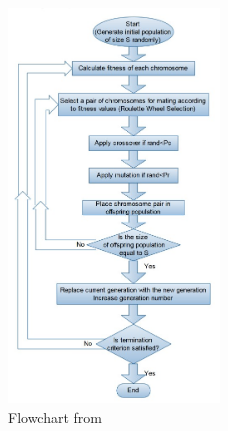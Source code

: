 \begin{figure}[h]
    \centering
    \includegraphics[width=0.5\textwidth]{figures/flowchart.jpg}
    \caption{Flowchart from \cite{tartan2016flow}}
    \label{fig:flowchart}
\end{figure}